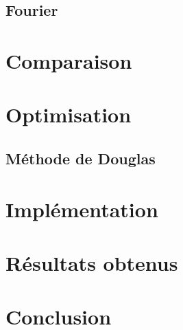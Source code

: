 \documentclass{article}
\begin{document}
\subsection{Fourier}

\section{Comparaison}

\section{Optimisation}
\subsection{Méthode de Douglas}

\section{Implémentation}
\section{Résultats obtenus}


\section{Conclusion}



\end{document}
